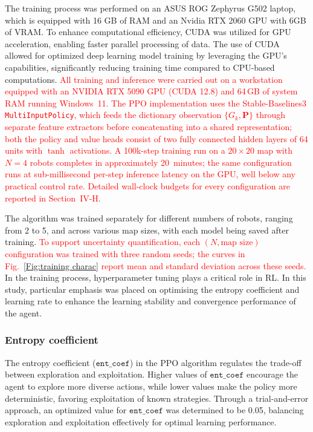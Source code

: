 \documentclass[journal]{IEEEtran}
\begin{document}
\textcolor{green!60!black}{The training process was performed on an ASUS ROG Zephyrus G502 laptop, which is equipped with 16 GB of RAM and an Nvidia RTX 2060 GPU with 6GB of VRAM. To enhance computational efficiency, CUDA was utilized for GPU acceleration, enabling faster parallel processing of data. The use of CUDA allowed for optimized deep learning model training by leveraging the GPU's capabilities, significantly reducing training time compared to CPU-based computations.}
\textcolor{red}{All training and inference were carried out on a workstation equipped with an NVIDIA RTX 5090 GPU (CUDA 12.8) and 64\,GB of system RAM running Windows~11. The PPO implementation uses the Stable-Baselines3 \texttt{MultiInputPolicy}, which feeds the dictionary observation $\{G_k, \mathbf{P}\}$ through separate feature extractors before concatenating into a shared representation; both the policy and value heads consist of two fully connected hidden layers of 64 units with $\tanh$ activations. A 100k-step training run on a $20{\times}20$ map with $N=4$ robots completes in approximately 20~minutes; the same configuration runs at sub-millisecond per-step inference latency on the GPU, well below any practical control rate. Detailed wall-clock budgets for every configuration are reported in Section~IV-H.}

The algorithm was trained separately for different numbers of robots, ranging from 2 to 5, and across various map sizes, with each model being saved after training. \textcolor{red}{To support uncertainty quantification, each $(N, \text{map size})$ configuration was trained with three random seeds; the curves in Fig.~\ref{Fig:training charac} report mean and standard deviation across these seeds.} In the training process, hyperparameter tuning plays a critical role in RL. In this study, particular emphasis was placed on optimising the entropy coefficient and learning rate to enhance the learning stability and convergence performance of the agent.

\subsubsection{Entropy coefficient}
The entropy coefficient ($\texttt{ent\_coef}$) in the PPO algorithm regulates the trade-off between exploration and exploitation. Higher values of $\texttt{ent\_coef}$ encourage the agent to explore more diverse actions, while lower values make the policy more deterministic, favoring exploitation of known strategies. Through a trial-and-error approach, an optimized value for $\texttt{ent\_coef}$ was determined to be 0.05, balancing exploration and exploitation effectively for optimal learning performance.
\end{document}
